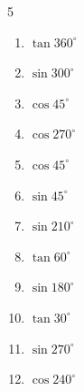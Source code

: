 \begin{multicols}{5}
\begin{enumerate}
  \item $\displaystyle \tan{360^\circ}$

        \phantom{$\displaystyle =0$}

  \item $\displaystyle \sin{300^\circ}$


  \item $\displaystyle \cos{45^\circ}$


\columnbreak %

\resetques

  \item $\displaystyle \cos{270^\circ}$

        \phantom{$\displaystyle =0$}

  \item $\displaystyle \cos{45^\circ}$


  \item $\displaystyle \sin{45^\circ}$


  \item $\displaystyle \sin{210^\circ}$


  \item $\displaystyle \tan{60^\circ}$


  \item $\displaystyle \sin{180^\circ}$

        \phantom{$\displaystyle =0$}

  \item $\displaystyle \tan{30^\circ}$


  \item $\displaystyle \sin{270^\circ}$

        \phantom{$\displaystyle =-1$}

  \item $\displaystyle \cos{240^\circ}$



\end{enumerate}
\end{multicols}

